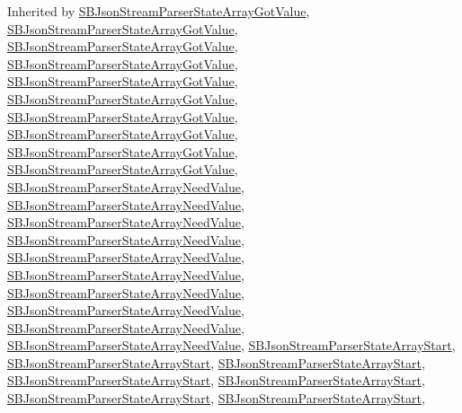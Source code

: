 \-Inherited by \hyperlink{interface_s_b_json_stream_parser_state_array_got_value}{\-S\-B\-Json\-Stream\-Parser\-State\-Array\-Got\-Value}, \hyperlink{interface_s_b_json_stream_parser_state_array_got_value}{\-S\-B\-Json\-Stream\-Parser\-State\-Array\-Got\-Value}, \hyperlink{interface_s_b_json_stream_parser_state_array_got_value}{\-S\-B\-Json\-Stream\-Parser\-State\-Array\-Got\-Value}, \hyperlink{interface_s_b_json_stream_parser_state_array_got_value}{\-S\-B\-Json\-Stream\-Parser\-State\-Array\-Got\-Value}, \hyperlink{interface_s_b_json_stream_parser_state_array_got_value}{\-S\-B\-Json\-Stream\-Parser\-State\-Array\-Got\-Value}, \hyperlink{interface_s_b_json_stream_parser_state_array_got_value}{\-S\-B\-Json\-Stream\-Parser\-State\-Array\-Got\-Value}, \hyperlink{interface_s_b_json_stream_parser_state_array_got_value}{\-S\-B\-Json\-Stream\-Parser\-State\-Array\-Got\-Value}, \hyperlink{interface_s_b_json_stream_parser_state_array_got_value}{\-S\-B\-Json\-Stream\-Parser\-State\-Array\-Got\-Value}, \hyperlink{interface_s_b_json_stream_parser_state_array_got_value}{\-S\-B\-Json\-Stream\-Parser\-State\-Array\-Got\-Value}, \hyperlink{interface_s_b_json_stream_parser_state_array_got_value}{\-S\-B\-Json\-Stream\-Parser\-State\-Array\-Got\-Value}, \hyperlink{interface_s_b_json_stream_parser_state_array_need_value}{\-S\-B\-Json\-Stream\-Parser\-State\-Array\-Need\-Value}, \hyperlink{interface_s_b_json_stream_parser_state_array_need_value}{\-S\-B\-Json\-Stream\-Parser\-State\-Array\-Need\-Value}, \hyperlink{interface_s_b_json_stream_parser_state_array_need_value}{\-S\-B\-Json\-Stream\-Parser\-State\-Array\-Need\-Value}, \hyperlink{interface_s_b_json_stream_parser_state_array_need_value}{\-S\-B\-Json\-Stream\-Parser\-State\-Array\-Need\-Value}, \hyperlink{interface_s_b_json_stream_parser_state_array_need_value}{\-S\-B\-Json\-Stream\-Parser\-State\-Array\-Need\-Value}, \hyperlink{interface_s_b_json_stream_parser_state_array_need_value}{\-S\-B\-Json\-Stream\-Parser\-State\-Array\-Need\-Value}, \hyperlink{interface_s_b_json_stream_parser_state_array_need_value}{\-S\-B\-Json\-Stream\-Parser\-State\-Array\-Need\-Value}, \hyperlink{interface_s_b_json_stream_parser_state_array_need_value}{\-S\-B\-Json\-Stream\-Parser\-State\-Array\-Need\-Value}, \hyperlink{interface_s_b_json_stream_parser_state_array_need_value}{\-S\-B\-Json\-Stream\-Parser\-State\-Array\-Need\-Value}, \hyperlink{interface_s_b_json_stream_parser_state_array_need_value}{\-S\-B\-Json\-Stream\-Parser\-State\-Array\-Need\-Value}, \hyperlink{interface_s_b_json_stream_parser_state_array_start}{\-S\-B\-Json\-Stream\-Parser\-State\-Array\-Start}, \hyperlink{interface_s_b_json_stream_parser_state_array_start}{\-S\-B\-Json\-Stream\-Parser\-State\-Array\-Start}, \hyperlink{interface_s_b_json_stream_parser_state_array_start}{\-S\-B\-Json\-Stream\-Parser\-State\-Array\-Start}, \hyperlink{interface_s_b_json_stream_parser_state_array_start}{\-S\-B\-Json\-Stream\-Parser\-State\-Array\-Start}, \hyperlink{interface_s_b_json_stream_parser_state_array_start}{\-S\-B\-Json\-Stream\-Parser\-State\-Array\-Start}, \hyperlink{interface_s_b_json_stream_parser_state_array_start}{\-S\-B\-Json\-Stream\-Parser\-State\-Array\-Start}, \hyperlink{interface_s_b_json_stream_parser_state_array_start}{\-S\-B\-Json\-Stream\-Parser\-State\-Array\-Start}, 